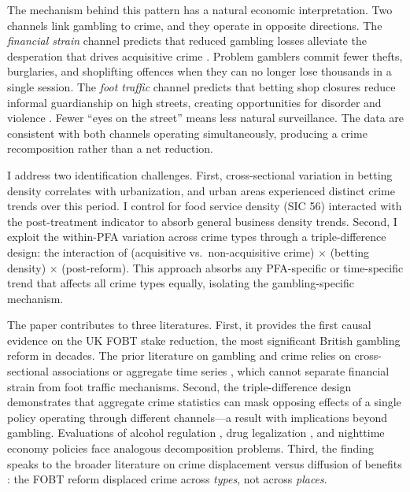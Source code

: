 \documentclass[12pt]{article}
\begin{document}
The mechanism behind this pattern has a natural economic interpretation. Two channels link gambling to crime, and they operate in opposite directions. The \textit{financial strain} channel predicts that reduced gambling losses alleviate the desperation that drives acquisitive crime \citep{grinols2004gambling}. Problem gamblers commit fewer thefts, burglaries, and shoplifting offences when they can no longer lose thousands in a single session. The \textit{foot traffic} channel predicts that betting shop closures reduce informal guardianship on high streets, creating opportunities for disorder and violence \citep{cohen1979social}. Fewer ``eyes on the street'' \citep{jacobs1961death} means less natural surveillance. The data are consistent with both channels operating simultaneously, producing a crime recomposition rather than a net reduction.

I address two identification challenges. First, cross-sectional variation in betting density correlates with urbanization, and urban areas experienced distinct crime trends over this period. I control for food service density (SIC 56) interacted with the post-treatment indicator to absorb general business density trends. Second, I exploit the within-PFA variation across crime types through a triple-difference design: the interaction of (acquisitive vs.\ non-acquisitive crime) $\times$ (betting density) $\times$ (post-reform). This approach absorbs any PFA-specific or time-specific trend that affects all crime types equally, isolating the gambling-specific mechanism.

The paper contributes to three literatures. First, it provides the first causal evidence on the UK FOBT stake reduction, the most significant British gambling reform in decades. The prior literature on gambling and crime relies on cross-sectional associations \citep{grinols2004gambling, reece2010casinos, cotti2016effects} or aggregate time series \citep{wheeler2011casino, weatherburn2014effect}, which cannot separate financial strain from foot traffic mechanisms. Second, the triple-difference design demonstrates that aggregate crime statistics can mask opposing effects of a single policy operating through different channels---a result with implications beyond gambling. Evaluations of alcohol regulation \citep{carpenter2007heavy, lindo2018college}, drug legalization \citep{dragone2019goes}, and nighttime economy policies face analogous decomposition problems. Third, the finding speaks to the broader literature on crime displacement versus diffusion of benefits \citep{weisburd2006does}: the FOBT reform displaced crime across \textit{types}, not across \textit{places}.
\end{document}
